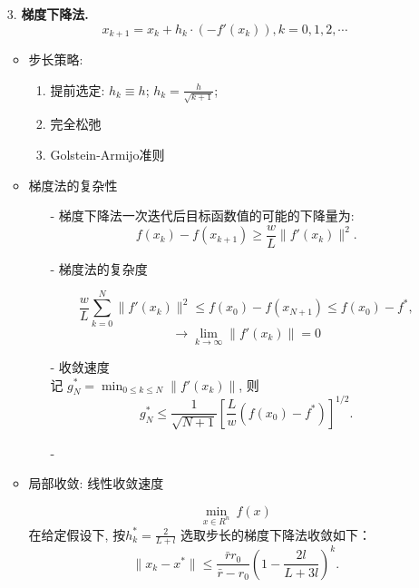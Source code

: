 \documentclass[handout]{beamer}
\begin{document}
\begin{frame}[allowframebreaks]

\begin{itemize}
    \item[3.] \textbf{梯度下降法.}
    $$x_{k+1} = x_k + h_k \cdot (-f'(x_k)), k=0,1,2,\cdots$$

\begin{itemize}

\item 步长策略:
\begin{enumerate}
\item 提前选定: $h_k \equiv h$; $h_k = \frac{h}{\sqrt{k+1}}$;
\item 完全松弛
\item Golstein-Armijo准则
\end{enumerate}

\item   梯度法的复杂性

  \begin{itemize}
    \item[-] 梯度下降法一次迭代后目标函数值的可能的下降量为:
     $$
        f(x_k) - f(x_{k+1}) \geq \frac{w}{L} \|f'(x_k)\|^2.
     $$

    \item[-] 梯度法的复杂度

     $$\frac{w}{L} \sum_{k=0}^{N} \|f'(x_k)\|^2 \leq f(x_0) - f(x_{N+1}) \leq f(x_0) - f^* ,$$
     $$\rightarrow \lim_{k\rightarrow \infty}^{} \|f'(x_k)\| = 0$$
    \item[-] 收敛速度\\
     记 $g_N^{*} = \min_{0\leq k \leq N} \|f'(x_k)\|$, 则
      $$
        g_N^{*} \leq \frac{1}{\sqrt{N+1}} [\frac{L}{w} (f(x_0)-f^*)]_{}^{1/2}.
     $$

     \item[-]  


  \end{itemize}

     \item 局部收敛: 线性收敛速度

     $$
    \min_{x\in R^n} \ f(x)
$$
在给定假设下, 按$h_k^{*} = \frac{2}{L+l}$ 选取步长的梯度下降法收敛如下：
$$
    \|x_k - x^* \| \leq \frac{\bar{r}r_0}{\bar{r}-r_0} \left(1-\frac{2l}{L+3l}\right)^{k}.
$$


\end{itemize}
 
\end{itemize}
\end{frame}
\end{document}
